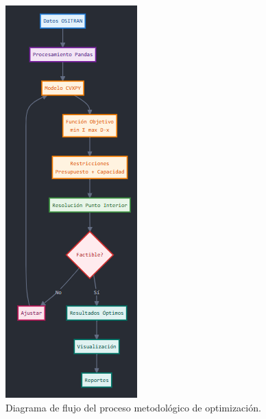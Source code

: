 \documentclass[11pt, a4paper, twocolumn]{article}
\begin{document}
\begin{figure}[H]
\centering
\includegraphics[width=\columnwidth]{images.png}
\caption{Diagrama de flujo del proceso metodológico de optimización.}
\label{fig:diagrama_flujo}
\end{figure}
\end{document}
